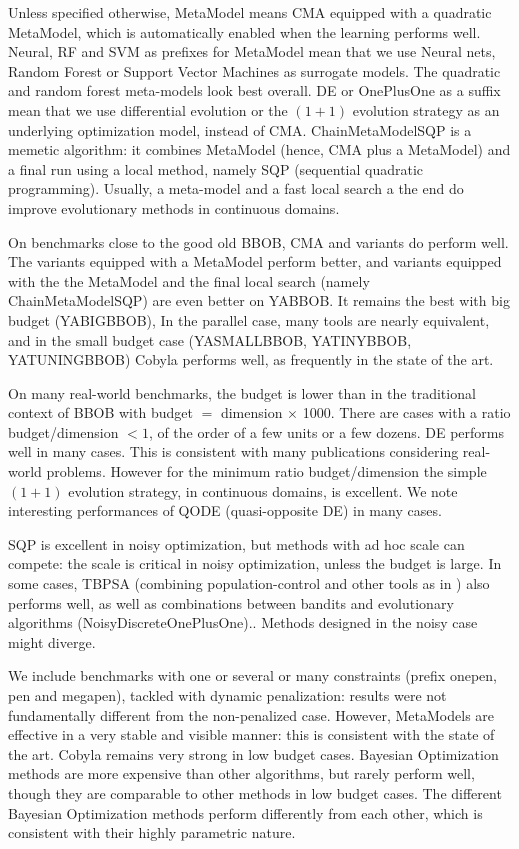 Unless specified otherwise, MetaModel means CMA equipped with a quadratic MetaModel, which is automatically enabled when the learning performs well.
Neural, RF and SVM as prefixes for MetaModel mean that we use Neural nets, Random Forest or Support Vector Machines as
surrogate models. The quadratic and random forest meta-models look best overall. DE or OnePlusOne as a suffix mean that
we use differential evolution or the $(1+1)$ evolution strategy as an underlying optimization model, instead of CMA.
ChainMetaModelSQP is a memetic algorithm: it combines MetaModel (hence, CMA plus a MetaModel) and a final run using a local method, namely SQP (sequential quadratic programming).
Usually, a meta-model and a fast local search a the end do improve evolutionary methods in continuous domains. 

On benchmarks close to the good old BBOB, CMA and variants do perform well. The variants equipped with a MetaModel perform better, and
variants equipped with the the MetaModel and the final local search (namely ChainMetaModelSQP) are even better on YABBOB. It
remains the best with big budget (YABIGBBOB), In the parallel case, many tools are nearly equivalent, and in the small
budget case (YASMALLBBOB, YATINYBBOB, YATUNINGBBOB) Cobyla performs well, as frequently in the state of the art.%

On many real-world benchmarks, the budget is lower than in the traditional context of BBOB with budget $=$ dimension $\times$ 1000. There
are cases with a ratio budget/dimension $<1$, of the order of a few units or a few dozens. DE performs well in many
cases. This is consistent with many publications considering real-world problems. %
However for the minimum ratio budget/dimension the simple $(1+1)$ evolution strategy, in continuous domains, is
excellent.
We note interesting performances of QODE (quasi-opposite DE) in many cases.

SQP is excellent in noisy optimization, but methods with ad hoc scale can compete: the scale is critical in noisy
optimization, unless the budget is large. In some cases, TBPSA (combining population-control\cite{mlis} and other tools
as in \cite{vasilfoga}) also performs well, as well as combinations between bandits and evolutionary algorithms
(NoisyDiscreteOnePlusOne)..
Methods designed in the noisy case might diverge.

We include benchmarks with one or several or many constraints (prefix onepen, pen and megapen), tackled with dynamic
penalization: results were not fundamentally different from the non-penalized case. However, MetaModels are effective in
a very stable and visible manner: this is consistent with the state of the art.%
Cobyla remains very strong in low budget cases. Bayesian Optimization methods are more expensive than other algorithms,
but rarely perform well, though they are comparable to other methods in low budget cases. The different Bayesian
Optimization methods perform differently from each other, which is consistent with their highly parametric nature.

